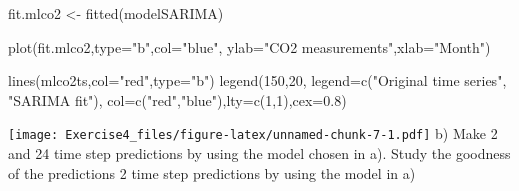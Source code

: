 \documentclass[
]{article}
\newenvironment{Shaded}{\begin{snugshade}}{\end{snugshade}}
\newcommand{\AttributeTok}[1]{\textcolor[rgb]{0.77,0.63,0.00}{#1}}
\newcommand{\ConstantTok}[1]{\textcolor[rgb]{0.00,0.00,0.00}{#1}}
\newcommand{\DecValTok}[1]{\textcolor[rgb]{0.00,0.00,0.81}{#1}}
\newcommand{\FloatTok}[1]{\textcolor[rgb]{0.00,0.00,0.81}{#1}}
\newcommand{\FunctionTok}[1]{\textcolor[rgb]{0.00,0.00,0.00}{#1}}
\newcommand{\NormalTok}[1]{#1}
\newcommand{\OtherTok}[1]{\textcolor[rgb]{0.56,0.35,0.01}{#1}}
\newcommand{\SpecialCharTok}[1]{\textcolor[rgb]{0.00,0.00,0.00}{#1}}
\newcommand{\StringTok}[1]{\textcolor[rgb]{0.31,0.60,0.02}{#1}}
\begin{document}
\begin{Shaded}
\begin{Highlighting}[]
\NormalTok{fit.mlco2 }\OtherTok{\textless{}{-}} \FunctionTok{fitted}\NormalTok{(modelSARIMA)}

\FunctionTok{plot}\NormalTok{(fit.mlco2,}\AttributeTok{type=}\StringTok{"b"}\NormalTok{,}\AttributeTok{col=}\StringTok{"blue"}\NormalTok{, }\AttributeTok{ylab=}\StringTok{"CO2 measurements"}\NormalTok{,}\AttributeTok{xlab=}\StringTok{"Month"}\NormalTok{)}

\FunctionTok{lines}\NormalTok{(mlco2ts,}\AttributeTok{col=}\StringTok{"red"}\NormalTok{,}\AttributeTok{type=}\StringTok{"b"}\NormalTok{)}
\FunctionTok{legend}\NormalTok{(}\DecValTok{150}\NormalTok{,}\DecValTok{20}\NormalTok{, }\AttributeTok{legend=}\FunctionTok{c}\NormalTok{(}\StringTok{"Original time series"}\NormalTok{, }\StringTok{"SARIMA fit"}\NormalTok{),}
\AttributeTok{col=}\FunctionTok{c}\NormalTok{(}\StringTok{"red"}\NormalTok{,}\StringTok{"blue"}\NormalTok{),}\AttributeTok{lty=}\FunctionTok{c}\NormalTok{(}\DecValTok{1}\NormalTok{,}\DecValTok{1}\NormalTok{),}\AttributeTok{cex=}\FloatTok{0.8}\NormalTok{)}
\end{Highlighting}
\end{Shaded}

\texttt{[image: Exercise4\_files/figure-latex/unnamed-chunk-7-1.pdf]} b)
Make 2 and 24 time step predictions by using the model chosen in a).
Study the goodness of the predictions 2 time step predictions by using
the model in a)

\begin{Shaded}
\end{Shaded}
\end{document}
